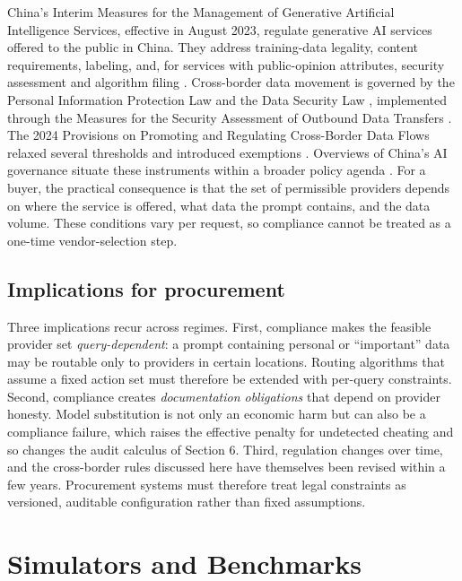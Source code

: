 China's Interim Measures for the Management of Generative Artificial Intelligence Services, effective in August 2023, regulate generative AI services offered to the public in China. They address training-data legality, content requirements, labeling, and, for services with public-opinion attributes, security assessment and algorithm filing \cite{cac2023genai}. Cross-border data movement is governed by the Personal Information Protection Law \cite{npc2021pipl} and the Data Security Law \cite{npc2021dsl}, implemented through the Measures for the Security Assessment of Outbound Data Transfers \cite{cac2022assessment}. The 2024 Provisions on Promoting and Regulating Cross-Border Data Flows relaxed several thresholds and introduced exemptions \cite{cac2024crossborder}. Overviews of China's AI governance situate these instruments within a broader policy agenda \cite{roberts2021chinese}. For a buyer, the practical consequence is that the set of permissible providers depends on where the service is offered, what data the prompt contains, and the data volume. These conditions vary per request, so compliance cannot be treated as a one-time vendor-selection step.

\subsection{Implications for procurement}\label{implications-for-procurement}

Three implications recur across regimes. First, compliance makes the feasible provider set \emph{query-dependent}: a prompt containing personal or ``important'' data may be routable only to providers in certain locations. Routing algorithms that assume a fixed action set must therefore be extended with per-query constraints. Second, compliance creates \emph{documentation obligations} that depend on provider honesty. Model substitution is not only an economic harm but can also be a compliance failure, which raises the effective penalty for undetected cheating and so changes the audit calculus of Section 6. Third, regulation changes over time, and the cross-border rules discussed here have themselves been revised within a few years. Procurement systems must therefore treat legal constraints as versioned, auditable configuration rather than fixed assumptions.

\section{Simulators and Benchmarks}\label{simulators-and-benchmarks}

